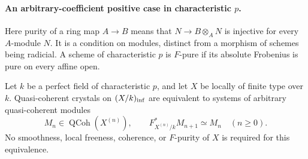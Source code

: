 \paragraph{An arbitrary-coefficient positive case in characteristic $p$.}

Here purity of a ring map $A\to B$ means that $N\to B\otimes_A N$ is injective for every $A$-module $N$.  It is a condition on modules, distinct from a morphism of schemes being radicial.  A scheme of characteristic $p$ is $F$-pure if its absolute Frobenius is pure on every affine open.

\begin{lemma}\label{lem:DE-crystal-Fdiv}
Let $k$ be a perfect field of characteristic $p$, and let $X$ be locally of finite type over $k$.  Quasi-coherent crystals on $(X/k)_{\rm inf}$ are equivalent to systems of arbitrary quasi-coherent modules
\[
       M_n\in\operatorname{QCoh}(X^{(n)}),\qquad
       F_{X^{(n)}/k}^*M_{n+1}\simeq M_n\quad(n\geq0).
\]
No smoothness, local freeness, coherence, or $F$-purity of $X$ is required for this equivalence.
\end{lemma}
